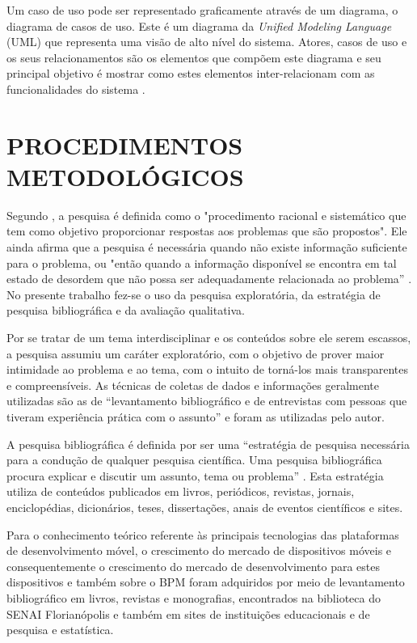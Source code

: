 \documentclass[
	12pt,				%
	openright,			%
	oneside,			%
	a4paper,			%
	chapter=TITLE,		%
	section=TITLE,		%
	english,			%
	french,				%
	spanish,			%
	brazil				%
	]{abntex2}
\begin{document}
Um caso de uso pode ser representado graficamente através de um diagrama, o diagrama de casos de uso. Este é um diagrama da \textit{Unified Modeling Language} (UML) que representa uma visão de alto nível do sistema. Atores, casos de uso e os seus relacionamentos são os elementos que compõem este diagrama e seu principal objetivo é mostrar como estes elementos inter-relacionam com as funcionalidades do sistema \cite{bezerraUML}. 
 


\chapter{PROCEDIMENTOS METODOLÓGICOS}

Segundo , a pesquisa é definida como o "procedimento racional e sistemático que tem como objetivo proporcionar respostas aos problemas que são propostos". Ele ainda afirma que a pesquisa é necessária quando não existe informação suficiente para o problema, ou "então quando a informação disponível se encontra em tal estado de desordem que não possa ser adequadamente relacionada ao problema” \cite[p. 1]{gilPesquisa}. No presente trabalho fez-se o uso da pesquisa exploratória, da estratégia de pesquisa bibliográfica e da avaliação qualitativa.

Por se tratar de um tema interdisciplinar e os conteúdos sobre ele serem escassos, a pesquisa assumiu um caráter exploratório, com o objetivo de prover maior intimidade ao problema e ao tema, com o intuito de torná-los mais transparentes e compreensíveis. As técnicas de coletas de dados e informações geralmente utilizadas são as de “levantamento bibliográfico e de entrevistas com pessoas que tiveram experiência prática com o assunto” \cite[p. 27]{gilPesquisa} e foram as utilizadas pelo autor.

A pesquisa bibliográfica é definida por ser uma “estratégia de pesquisa necessária para a condução de qualquer pesquisa científica. Uma pesquisa bibliográfica procura explicar e discutir um assunto, tema ou problema” \cite[p. 54]{martinsTheophiloMetodologia}. Esta estratégia utiliza de conteúdos publicados em livros, periódicos, revistas, jornais, enciclopédias, dicionários, teses, dissertações, anais de eventos científicos e sites.

Para o conhecimento teórico referente às principais tecnologias das plataformas de desenvolvimento móvel, o crescimento do mercado de dispositivos móveis e consequentemente o crescimento do mercado de desenvolvimento para estes dispositivos e também sobre o BPM foram adquiridos por meio de levantamento bibliográfico em livros, revistas e monografias, encontrados na biblioteca do SENAI Florianópolis e também em sites de instituições educacionais e de pesquisa e estatística.
\end{document}
